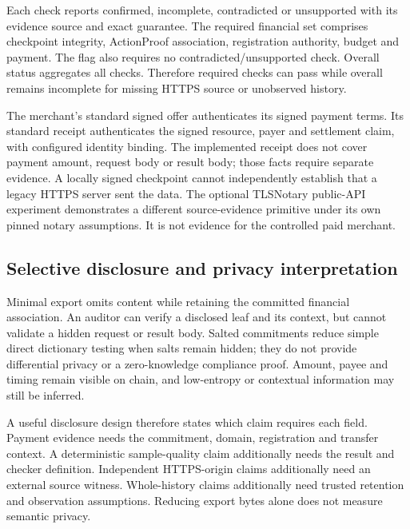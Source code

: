 Each check reports confirmed, incomplete, contradicted or unsupported with its evidence source and exact guarantee. The required financial set comprises checkpoint integrity, ActionProof association, registration authority, budget and payment. The flag  also requires no contradicted/unsupported check. Overall status aggregates all checks. Therefore required checks can pass while overall remains incomplete for missing HTTPS source or unobserved history.

The merchant's standard signed offer authenticates its signed payment terms. Its standard receipt authenticates the signed resource, payer and settlement claim, with configured identity binding. The implemented receipt does not cover payment amount, request body or result body; those facts require separate evidence.\citep{x402receipt} A locally signed checkpoint cannot independently establish that a legacy HTTPS server sent the data. The optional TLSNotary public-API experiment demonstrates a different source-evidence primitive under its own pinned notary assumptions. It is not evidence for the controlled paid merchant.\citep{tlsnotary}

\subsection{Selective disclosure and privacy interpretation}
Minimal export omits content while retaining the committed financial association. An auditor can verify a disclosed leaf and its context, but cannot validate a hidden request or result body. Salted commitments reduce simple direct dictionary testing when salts remain hidden; they do not provide differential privacy or a zero-knowledge compliance proof. Amount, payee and timing remain visible on chain, and low-entropy or contextual information may still be inferred.

A useful disclosure design therefore states which claim requires each field. Payment evidence needs the commitment, domain, registration and transfer context. A deterministic sample-quality claim additionally needs the result and checker definition. Independent HTTPS-origin claims additionally need an external source witness. Whole-history claims additionally need trusted retention and observation assumptions. Reducing export bytes alone does not measure semantic privacy.
